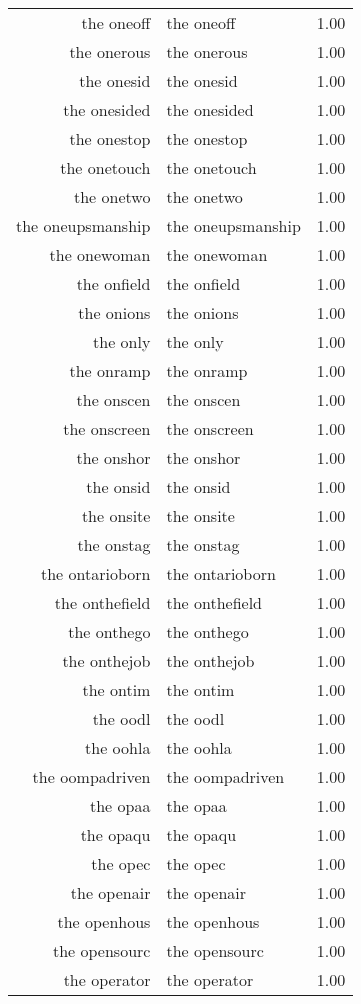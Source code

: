 \begin{table}[ht]
\begin{tabular}{rlr}
  the oneoff & the oneoff & 1.00 \\ 
  the onerous & the onerous & 1.00 \\ 
  the onesid & the onesid & 1.00 \\ 
  the onesided & the onesided & 1.00 \\ 
  the onestop & the onestop & 1.00 \\ 
  the onetouch & the onetouch & 1.00 \\ 
  the onetwo & the onetwo & 1.00 \\ 
  the oneupsmanship & the oneupsmanship & 1.00 \\ 
  the onewoman & the onewoman & 1.00 \\ 
  the onfield & the onfield & 1.00 \\ 
  the onions & the onions & 1.00 \\ 
  the only & the only & 1.00 \\ 
  the onramp & the onramp & 1.00 \\ 
  the onscen & the onscen & 1.00 \\ 
  the onscreen & the onscreen & 1.00 \\ 
  the onshor & the onshor & 1.00 \\ 
  the onsid & the onsid & 1.00 \\ 
  the onsite & the onsite & 1.00 \\ 
  the onstag & the onstag & 1.00 \\ 
  the ontarioborn & the ontarioborn & 1.00 \\ 
  the onthefield & the onthefield & 1.00 \\ 
  the onthego & the onthego & 1.00 \\ 
  the onthejob & the onthejob & 1.00 \\ 
  the ontim & the ontim & 1.00 \\ 
  the oodl & the oodl & 1.00 \\ 
  the oohla & the oohla & 1.00 \\ 
  the oompadriven & the oompadriven & 1.00 \\ 
  the opaa & the opaa & 1.00 \\ 
  the opaqu & the opaqu & 1.00 \\ 
  the opec & the opec & 1.00 \\ 
  the openair & the openair & 1.00 \\ 
  the openhous & the openhous & 1.00 \\ 
  the opensourc & the opensourc & 1.00 \\ 
  the operator & the operator & 1.00 \\ 

\end{tabular}
\end{table}
